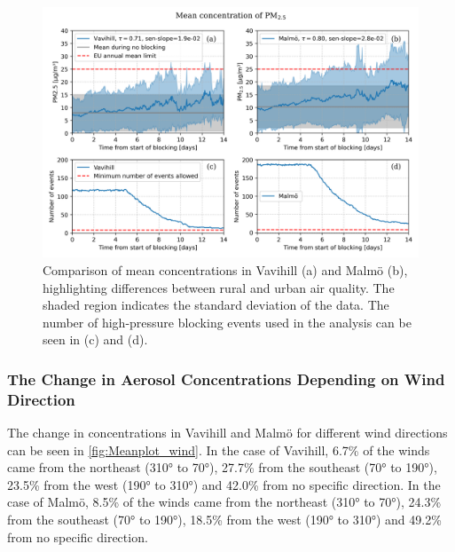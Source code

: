 \begin{figure}[H]
    \centering
    \includegraphics[width=\textwidth]{Figures/Meanplot.png}
    \caption{Comparison of mean \PM  concentrations in Vavihill (a) and Malmö (b), highlighting differences between rural and urban air quality. The shaded region indicates the standard deviation of the data. The number of high-pressure blocking events used in the analysis can be seen in (c) and (d).}
    \label{fig:Meanplot_Comparison}
\end{figure}

\subsubsection{The Change in Aerosol Concentrations Depending on Wind Direction}

The change in \PM concentrations in Vavihill and Malmö for different wind directions can be seen in \autoref{fig:Meanplot_wind}. In the case of Vavihill, 6.7\% of the winds came from the northeast (310° to 70°), 27.7\% from the southeast (70° to 190°), 23.5\% from the west (190° to 310°) and 42.0\% from no specific direction. In the case of Malmö, 8.5\% of the winds came from the northeast (310° to 70°), 24.3\% from the southeast (70° to 190°), 18.5\% from the west (190° to 310°) and 49.2\% from no specific direction. 


